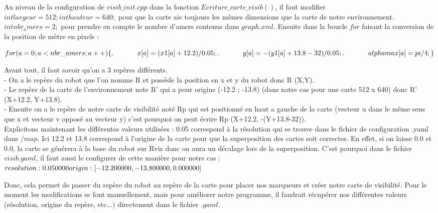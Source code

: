 \documentclass[10pt,a4paper]{article}
\begin{document}
Au niveau de la configuration de $visib\_init.cpp$ dans la fonction $Ecriture\_carte\_visib()$, il faut modifier $int largeur=512;	 int hauteur=640;$ pour que la carte aie toujours les mêmes dimensions que la carte de notre environnement. $int nbr_amers=2;$ pour prendre en compte le nombre d'amers contenus dans $graph.xml$. Ensuite dans la boucle $for$ faisant la conversion de la position de mètre en pixels :

$\\
for(a=0;a<nbr\_amers;a++)\\
	\{ \\
. \hspace{35pt}    x[a]=(x1[a]+12.2)/0.05;\\
. \hspace{35pt}    y[a]=-(y1[a]+13.8-32)/0.05;\\
. \hspace{35pt}    alphamax[a]=pi/4;\\
	\}\\
	$


Avant tout, il faut savoir qu'on a 3 repères différents.\\ 
- On a le repère du robot que l'on nomme R et possède la position en x et y du robot donc R (X,Y).\\
- Le repère de la carte de l'environnement note R' qui a pour origine (-12.2 ; -13.8) (dans notre cas pour une carte 512 x 640) donc R' (X+12.2, Y+13.8).\\ 
- Ensuite on a le repère de notre carte de visibilité noté Rp qui est positionné en haut a gauche de la carte (vecteur u dans le même sens que x et vecteur v opposé au vecteur y) c'est pourquoi on peut écrire Rp (X+12.2, -(Y+13.8-32)).\\

Explicitons maintenant les différentes valeurs utilisées : 0.05 correspond à la résolution qui se trouve dans le fichier de configuration .yaml dans $/map$. Ici 12.2 et 13.8 correspond à l'origine de la carte pour que la superposition des cartes soit correctes. En effet, si on laisse 0.0 et 0.0, la carte se générera à la base du robot sur Rviz donc on aura un décalage lors de la superposition. C'est pourquoi dans le fichier $visib.yaml$, il faut aussi le configurer de cette manière pour notre cas :\\
$resolution: 0.050000\\
origin: [-12.200000, -13.800000, 0.000000]\\
$

Donc, cela permet de passer du repère du robot au repère de la carte pour placer nos marqueurs et créer notre carte de visibilité. Pour le moment les modifications se font manuellement, mais pour améliorer notre programme, il faudrait récupérer nos différentes valeurs (résolution, origine du repère, etc...) directement dans le fichier $.yaml$.\\
\end{document}

